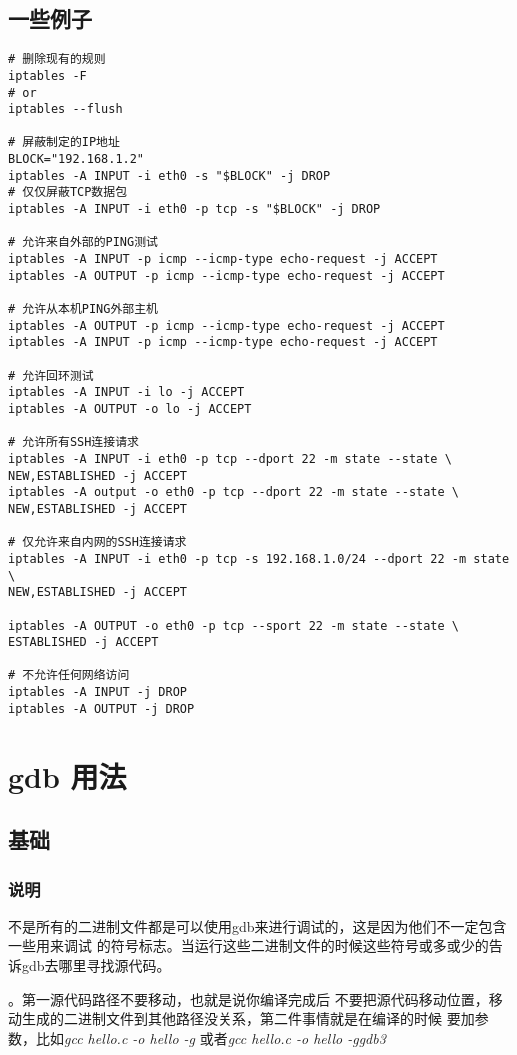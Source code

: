\documentclass{article}
\begin{document}
\subsection{一些例子}
\begin{verbatim}
# 删除现有的规则
iptables -F
# or
iptables --flush

# 屏蔽制定的IP地址
BLOCK="192.168.1.2"
iptables -A INPUT -i eth0 -s "$BLOCK" -j DROP
# 仅仅屏蔽TCP数据包
iptables -A INPUT -i eth0 -p tcp -s "$BLOCK" -j DROP

# 允许来自外部的PING测试
iptables -A INPUT -p icmp --icmp-type echo-request -j ACCEPT
iptables -A OUTPUT -p icmp --icmp-type echo-request -j ACCEPT

# 允许从本机PING外部主机
iptables -A OUTPUT -p icmp --icmp-type echo-request -j ACCEPT
iptables -A INPUT -p icmp --icmp-type echo-request -j ACCEPT

# 允许回环测试
iptables -A INPUT -i lo -j ACCEPT
iptables -A OUTPUT -o lo -j ACCEPT

# 允许所有SSH连接请求
iptables -A INPUT -i eth0 -p tcp --dport 22 -m state --state \
NEW,ESTABLISHED -j ACCEPT
iptables -A output -o eth0 -p tcp --dport 22 -m state --state \
NEW,ESTABLISHED -j ACCEPT

# 仅允许来自内网的SSH连接请求
iptables -A INPUT -i eth0 -p tcp -s 192.168.1.0/24 --dport 22 -m state \
NEW,ESTABLISHED -j ACCEPT

iptables -A OUTPUT -o eth0 -p tcp --sport 22 -m state --state \
ESTABLISHED -j ACCEPT

# 不允许任何网络访问
iptables -A INPUT -j DROP
iptables -A OUTPUT -j DROP

\end{verbatim}
\section{gdb 用法}
\subsection{基础}
\subsubsection{说明}
不是所有的二进制文件都是可以使用gdb来进行调试的，这是因为他们不一定包含一些用来调试
的符号标志。当运行这些二进制文件的时候这些符号或多或少的告诉gdb去哪里寻找源代码。


\indent使用gdb进行调试必须满足两个条件。第一源代码路径不要移动，也就是说你编译完成后
不要把源代码移动位置，移动生成的二进制文件到其他路径没关系，第二件事情就是在编译的时候
要加参数，比如\textit{gcc hello.c -o hello -g} 或者\textit{gcc hello.c -o hello -ggdb3}
\end{document}

